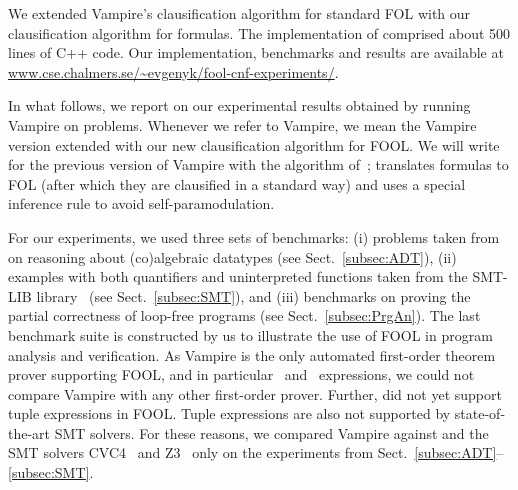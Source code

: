 
We extended Vampire's \newcnf{} clausification algorithm for standard FOL with our \nfcnf{} clausification algorithm for \folb{} formulas. 
The implementation of \nfcnf{} comprised about 500 lines of C++ code. 
Our implementation, benchmarks and results are available at \url{www.cse.chalmers.se/~evgenyk/fool-cnf-experiments/}. 


In what follows, we report on our experimental results obtained by running Vampire on \folb{} problems. 
Whenever we refer to Vampire, we mean the Vampire version extended with our new \nfcnf{} clausification algorithm for FOOL. 
We will write \oldcnfVampire{} for the previous version of Vampire
with the \oldcnf{} algorithm of~\cite{VampireAndFOOL};
\oldcnfVampire{} translates \folb{} formulas to FOL (after which they are clausified in a standard way)
and uses a special inference rule to avoid \folb{} self-paramodulation. 

For our experiments, we used three sets of benchmarks: 
(i) problems taken from~\cite{Blanchette15} on reasoning about (co)al\-ge\-braic datatypes (see Sect.~\ref{subsec:ADT}), 
(ii) examples with both quantifiers and uninterpreted functions taken from the SMT-LIB library~\cite{SMT-LIB} (see Sect.~\ref{subsec:SMT}), and
(iii) benchmarks on proving the partial correctness of loop-free programs (see Sect.~\ref{subsec:PrgAn}). The last benchmark suite is constructed by us to 
illustrate the use of FOOL in program analysis and verification. 
As Vampire is the only automated first-order theorem prover supporting FOOL, and in particular \ITE\ and \LETIN\ expressions, 
we could not compare Vampire with any other first-order prover. 
Further,  \oldcnfVampire{} did not yet support tuple expressions in
FOOL. Tuple expressions are also not supported by state-of-the-art SMT
solvers. For these reasons, we compared Vampire against \oldcnfVampire{}
and the SMT solvers CVC4~\cite{CVC4} and Z3~\cite{Z3}  only on the experiments from
Sect.~\ref{subsec:ADT}--\ref{subsec:SMT}.

